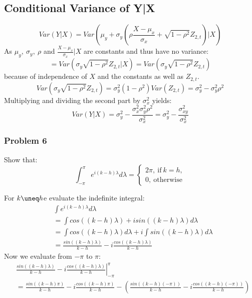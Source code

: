 \message{ !name(three_four.tex)}\documentclass[11pt]{article}
\begin{document}
\subsection{Conditional Variance of Y|X}
\label{sec:cond-vari-yx}
\begin{equation}
  \label{eq:16}
    Var(Y|X) = Var(\mu_y + \sigma_y (\rho \frac{X-\mu_x}{\sigma_x} + \sqrt{1-\rho^2} Z_{2,t})|X)
\end{equation}
As $\mu_y,\ \sigma_y,\ \rho$ and $\frac{X-\mu_x}{\sigma_x}|X$ are constants and thus have no variance:
\begin{equation}
  \label{eq:17}
  = Var(\sigma_y \sqrt{1-\rho^2} Z_{2,t}|X) = Var(\sigma_y \sqrt{1-\rho^2} Z_{2,t})
\end{equation}
because of independence of $X$ and the constants as well as $Z_{2,t}$.
\begin{equation}
  \label{eq:18}
  Var(\sigma_y \sqrt{1-\rho^2} Z_{2,t}) = \sigma_y^2 (1-\rho^2) Var(Z_{2,t}) = \sigma_y^2 - \sigma_y^2 \rho^2
\end{equation}
Multiplying and dividing the second part by $\sigma_x^2$ yields:
\begin{equation}
  \label{eq:19}
  Var(Y|X) = \sigma_y^2 - \frac{\sigma_x^2 \sigma_y^2 \rho^2}{\sigma_x^2} = \sigma_y^2 - \frac{\sigma_{xy}^2}{\sigma_x^2}
\end{equation}



\subsubsection*{Problem 6}
\label{sec:problem-6}

Show that:
\[
  \int_{-\pi}^\pi e^{i(k-h)\lambda} d \lambda = \left\{
    \begin{array}{ll}
      2\pi,\ \text{if} \ k=h,\\
      0,\ \text{otherwise}
    \end{array}
     \right.
\]


For $k\uneq h$e evaluate the indefinite integral:
\begin{equation}
  \label{eq:21}
  \begin{split}
    &\int  e^{i(k-h)\lambda} d \lambda\\
    &= \int cos((k-h) \lambda) + i sin((k-h) \lambda) d \lambda\\
    &= \int cos((k-h) \lambda) d \lambda + i \int sin((k-h)\lambda) d \lambda\\
    &= \frac{sin((k-h) \lambda)}{k-h} - i \frac{cos((k-h) \lambda)}{k-h}
  \end{split}
\end{equation}
Now we evaluate from $-\pi$ to $\pi$:
\begin{equation}
  \label{eq:23}
  \begin{split}
    &\left.  \frac{sin((k-h) \lambda)}{k-h} - i \frac{cos((k-h) \lambda)}{k-h} \right\vert_{-\pi}^\pi\\
    &=  \frac{sin((k-h) \pi)}{k-h} - i \frac{cos((k-h) \pi)}{k-h} - \left( \frac{sin((k-h) (-\pi))}{k-h} - i \frac{cos((k-h) (-\pi))}{k-h}\right)
  \end{split}
\end{equation}



\printbibliography
\end{document}
